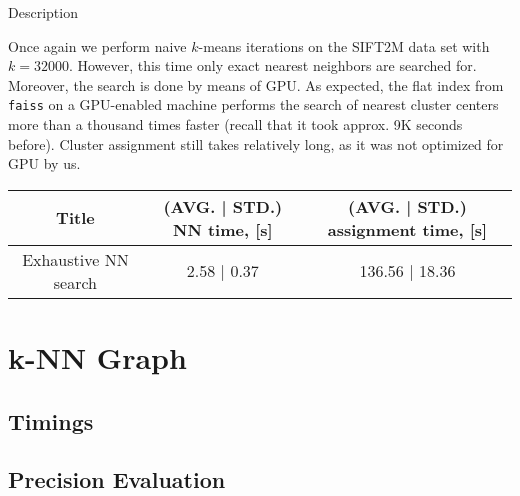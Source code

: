 \begin{frame}

\begin{block}{Description}

Once again we perform naive $k$-means iterations on the SIFT2M data set with $k = 32000$. However, this time only exact nearest neighbors are searched for. Moreover, the search is done by means of GPU. As expected, the flat index from \texttt{faiss} on a GPU-enabled machine performs the search of nearest cluster centers more than a thousand times faster (recall that it took approx. 9K seconds before). Cluster assignment still takes relatively long, as it was not optimized for GPU by us.
	
\end{block}


	\begin{table}
		\small
		\begin{tabular}{| c || c | c |}
			\hline
			Title & (AVG. | STD.) NN time, [s] & (AVG. | STD.) assignment time, [s] \\
			\hline
			\hline			
			Exhaustive NN search& 2.58 | 0.37 & 136.56 | 18.36 \\
			\hline  
		\end{tabular}
	\end{table}
\end{frame}


\section{k-NN Graph}
\subsection{Timings}


\begin{frame}
	
\end{frame}


\subsection{Precision Evaluation}


\begin{frame}
	
\end{frame}
